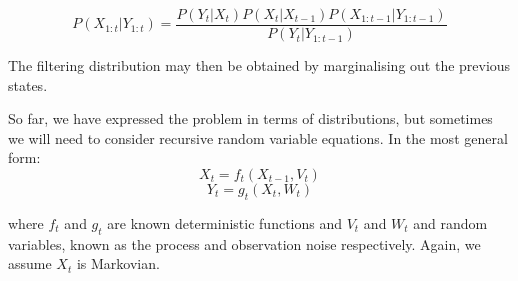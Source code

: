 \begin{equation}
P(X_{1:t}|Y_{1:t}) = \frac{P(Y_t|X_t)P(X_t|X_{t-1})P(X_{1:t-1}|Y_{1:t-1})}{P(Y_t|Y_{1:t-1})}
\label{eq:JointSeqBayesRule}
\end{equation}

The filtering distribution may then be obtained by marginalising out the previous states.

So far, we have expressed the problem in terms of distributions, but sometimes we will need to consider recursive random variable equations. In the most general form:
\begin{equation}
X_t = f_t(X_{t-1}, V_t)
\label{eq:FilterEq1}
\end{equation}
\begin{equation}
Y_t = g_t(X_t, W_t)
\label{eq:FilterEq2}
\end{equation}

where $f_t$ and $g_t$ are known deterministic functions and $V_t$ and $W_t$ and random variables, known as the process and observation noise respectively. Again, we assume $X_t$ is Markovian.